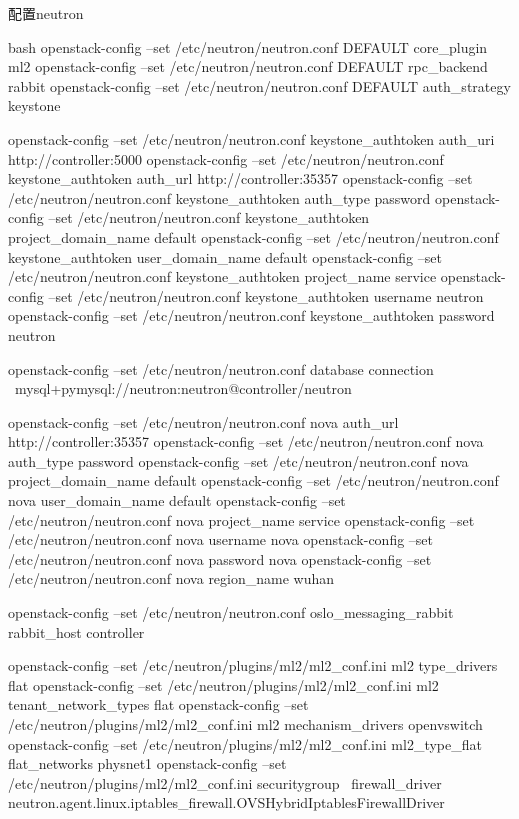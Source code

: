 配置neutron
\begin{code-block}{bash}
openstack-config --set /etc/neutron/neutron.conf DEFAULT core_plugin ml2
openstack-config --set /etc/neutron/neutron.conf DEFAULT rpc_backend rabbit
openstack-config --set /etc/neutron/neutron.conf DEFAULT auth_strategy keystone

openstack-config --set /etc/neutron/neutron.conf keystone_authtoken auth_uri http://controller:5000
openstack-config --set /etc/neutron/neutron.conf keystone_authtoken auth_url http://controller:35357
openstack-config --set /etc/neutron/neutron.conf keystone_authtoken auth_type password
openstack-config --set /etc/neutron/neutron.conf keystone_authtoken project_domain_name default
openstack-config --set /etc/neutron/neutron.conf keystone_authtoken user_domain_name default
openstack-config --set /etc/neutron/neutron.conf keystone_authtoken project_name service
openstack-config --set /etc/neutron/neutron.conf keystone_authtoken username neutron
openstack-config --set /etc/neutron/neutron.conf keystone_authtoken password neutron

openstack-config --set /etc/neutron/neutron.conf database connection \
    mysql+pymysql://neutron:neutron@controller/neutron

openstack-config --set /etc/neutron/neutron.conf nova auth_url http://controller:35357
openstack-config --set /etc/neutron/neutron.conf nova auth_type password
openstack-config --set /etc/neutron/neutron.conf nova project_domain_name default
openstack-config --set /etc/neutron/neutron.conf nova user_domain_name default
openstack-config --set /etc/neutron/neutron.conf nova project_name service
openstack-config --set /etc/neutron/neutron.conf nova username nova
openstack-config --set /etc/neutron/neutron.conf nova password nova
openstack-config --set /etc/neutron/neutron.conf nova region_name wuhan

openstack-config --set /etc/neutron/neutron.conf oslo_messaging_rabbit rabbit_host controller

openstack-config --set /etc/neutron/plugins/ml2/ml2_conf.ini ml2 type_drivers flat
openstack-config --set /etc/neutron/plugins/ml2/ml2_conf.ini ml2 tenant_network_types flat
openstack-config --set /etc/neutron/plugins/ml2/ml2_conf.ini ml2 mechanism_drivers openvswitch
openstack-config --set /etc/neutron/plugins/ml2/ml2_conf.ini ml2_type_flat flat_networks physnet1
openstack-config --set /etc/neutron/plugins/ml2/ml2_conf.ini securitygroup \
    firewall_driver neutron.agent.linux.iptables_firewall.OVSHybridIptablesFirewallDriver


\end{code-block}
